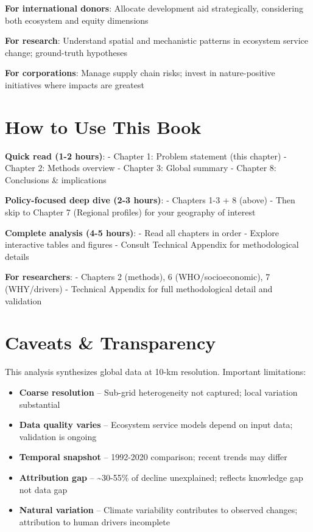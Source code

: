 \documentclass[
  letterpaper,
  DIV=11,
  numbers=noendperiod]{scrreprt}
\providecommand{\tightlist}{%
  \setlength{\itemsep}{0pt}\setlength{\parskip}{0pt}}
\begin{document}
\textbf{For international donors}: Allocate development aid
strategically, considering both ecosystem and equity dimensions

\textbf{For research}: Understand spatial and mechanistic patterns in
ecosystem service change; ground-truth hypotheses

\textbf{For corporations}: Manage supply chain risks; invest in
nature-positive initiatives where impacts are greatest

\section{How to Use This Book}\label{how-to-use-this-book}

\textbf{Quick read (1-2 hours)}: - Chapter 1: Problem statement (this
chapter) - Chapter 2: Methods overview - Chapter 3: Global summary -
Chapter 8: Conclusions \& implications

\textbf{Policy-focused deep dive (2-3 hours)}: - Chapters 1-3 + 8
(above) - Then skip to Chapter 7 (Regional profiles) for your geography
of interest

\textbf{Complete analysis (4-5 hours)}: - Read all chapters in order -
Explore interactive tables and figures - Consult Technical Appendix for
methodological details

\textbf{For researchers}: - Chapters 2 (methods), 6 (WHO/socioeconomic),
7 (WHY/drivers) - Technical Appendix for full methodological detail and
validation

\section{Caveats \& Transparency}\label{caveats-transparency}

This analysis synthesizes global data at 10-km resolution. Important
limitations:

\begin{itemize}
\tightlist
\item
  \textbf{Coarse resolution} -- Sub-grid heterogeneity not captured;
  local variation substantial
\item
  \textbf{Data quality varies} -- Ecosystem service models depend on
  input data; validation is ongoing
\item
  \textbf{Temporal snapshot} -- 1992-2020 comparison; recent trends may
  differ
\item
  \textbf{Attribution gap} -- \textasciitilde30-55\% of decline
  unexplained; reflects knowledge gap not data gap
\item
  \textbf{Natural variation} -- Climate variability contributes to
  observed changes; attribution to human drivers incomplete
\end{itemize}
\end{document}
